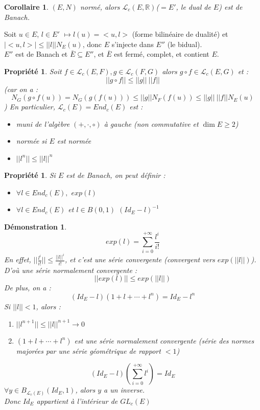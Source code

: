 \documentclass[a4paper, oneside]{report}
\theoremstyle{break}
\newtheorem{propr}[thm]{Propriété}
\newtheorem{cor}[thm]{Corollaire}
\newtheorem*{demo}{Démonstration}
\newcommand{\R}{\mathbb{R}}
\renewcommand{\L}{\mathcal{L}}
\begin{document}
\begin{cor}
$(E,N)$ normé, alors $\L_c(E,\R)$($=E'$, le dual de $E$) est de Banach.
\end{cor}

Soit $u\in E$, $l\in E'$ $\mapsto l(u)=<u,l>$ (forme bilinéaire de dualité) et $|<u,l>|\leq ||l||N_E(u)$, donc $E$ s'injecte dans $E''$ (le bidual).\\
$E''$ est de Banach et $\bar{E} \subseteq E''$, et $\bar{E}$ est fermé, complet, et contient $E$.

\begin{propr}
Soit $f\in \L_c(E,F), g\in \L_c(F,G)$ alors $g\circ f\in \L_c(E,G)$ et :
$$||g\circ f|| \leq  ||g||~||f||$$
(car on a :
$$N_G(g\circ f(u)) = N_G(g(f(u))) \leq ||g||N_F(f(u)) \leq ||g||~||f||N_E(u)$$
)
En particulier, $\L_c(E)=End_c(E)$ est :
\begin{itemize}
\item muni de l'algèbre $(+,\cdot, \circ)$ à gauche (non commutative et $\dim E\geq 2$)
\item normée si $E$ est normée
\item $||l^n||\leq ||l||^n$
\end{itemize}
\end{propr}

\begin{propr}
\item Si $E$ est de Banach, on peut définir :
\begin{itemize}
\item $\forall l\in End_c(E),$ $exp(l)$
\item $\forall l\in End_c(E)$ et $l\in B(0,1)$ $(Id_E-l)^{-1}$
\end{itemize}
\end{propr}

\begin{demo}
$$exp(l)=\sum_{i=0}^{+\infty}\frac{l^i}{i!}$$
En effet, $||\frac{l^i}{i!}|| \leq \frac{||l||^i}{i!}$, et c'est une série convergente (convergent vers $exp(||l||)$).
D'où une série normalement convergente :
$$||exp(l)||\leq exp(||l||)$$
De plus, on a :
$$(Id_E-l)(1+l+\cdots+l^n)=Id_E-l^n$$
Si $||l||< 1$, alors :
\begin{enumerate}
\item $||l^{n+1}||\leq ||l||^{n+1}\rightarrow 0$
\item $(1+l+\cdots+l^n)$ est une série normalement convergente (série des normes majorées par une série géométrique de rapport $< 1$)
\end{enumerate}
$$(Id_E-l)(\sum_{i=0}^{+\infty}l^i)=Id_E$$
$\forall y\in B_{\L_c(E)}(Id_E,1)$, alors $y$ a un inverse.\\
Donc $Id_E$ appartient à l'intérieur de $GL_c(E)$
\end{demo}
\end{document}
